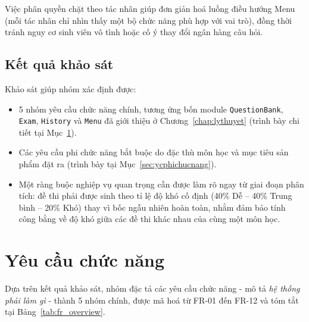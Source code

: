 \documentclass[11pt]{report}
\begin{document}
Việc phân quyền chặt theo tác nhân giúp đơn giản hoá luồng điều hướng Menu (mỗi tác nhân chỉ nhìn thấy một bộ chức năng phù hợp với vai trò), đồng thời tránh nguy cơ sinh viên vô tình hoặc cố ý thay đổi ngân hàng câu hỏi.

\subsection{Kết quả khảo sát}

Khảo sát giúp nhóm xác định được:

\begin{itemize}[leftmargin=*]
    \item 5 nhóm yêu cầu chức năng chính, tương ứng bốn module \texttt{QuestionBank}, \texttt{Exam}, \texttt{History} và \texttt{Menu} đã giới thiệu ở Chương~\ref{chap:lythuyet} (trình bày chi tiết tại Mục~\ref{sec:ycchucnang}).
    \item Các yêu cầu phi chức năng bắt buộc do đặc thù môn học và mục tiêu sản phẩm đặt ra (trình bày tại Mục~\ref{sec:ycphichucnang}).
    \item Một ràng buộc nghiệp vụ quan trọng cần được làm rõ ngay từ giai đoạn phân tích: đề thi phải được sinh theo tỉ lệ độ khó cố định (40\% Dễ -- 40\% Trung bình -- 20\% Khó) thay vì bốc ngẫu nhiên hoàn toàn, nhằm đảm bảo tính công bằng về độ khó giữa các đề thi khác nhau của cùng một môn học.
\end{itemize}

\section{Yêu cầu chức năng}
\label{sec:ycchucnang}

Dựa trên kết quả khảo sát, nhóm đặc tả các yêu cầu chức năng - mô tả \textit{hệ thống phải làm gì} - thành 5 nhóm chính, được mã hoá từ FR-01 đến FR-12 và tóm tắt tại Bảng~\ref{tab:fr_overview}.
\end{document}
